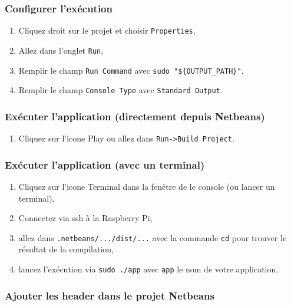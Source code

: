 \documentclass[11pt]{paper}
\newcommand{\raspi}{Raspberry Pi\xspace}
\begin{document}
\subsubsection{Configurer l'exécution}

\begin{enumerate}
\item Cliquez droit sur le projet et choisir {\tt Properties},
\item Allez dans l'onglet {\tt Run},
\item Remplir le champ {\tt Run Command} avec {\tt sudo "\$\{OUTPUT\_PATH\}"},
\item Remplir le champ {\tt Console Type} avec {\tt Standard Output}.
\end{enumerate}

\subsubsection{Exécuter l'application (directement depuis Netbeans)}
\begin{enumerate}
\item Cliquez sur l'icone \og Play \fg ou allez dans {\tt Run->Build Project}.
\end{enumerate}

\subsubsection{Exécuter l'application (avec un terminal)}
\begin{enumerate}
\item Cliquez sur l'icone \og Terminal \fg dans la fenêtre de le console (ou lancer un terminal),
\item Connectez via ssh à la \raspi,
\item allez dans {\tt .netbeans/.../dist/...} avec la commande {\tt cd} pour trouver le résultat de la compilation,
\item lancez l'exécution via {\tt sudo ./app} avec {\tt app} le nom de votre application.
\end{enumerate}

\subsubsection{Ajouter les header dans le projet Netbeans}
\end{document}

